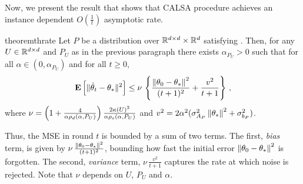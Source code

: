 Now, we present the result that shows that CALSA procedure achieves an instance dependent $O(\frac{1}{t})$ asymptotic rate.
\fi
\begin{restatable}{theorem}{thrate}\label{th:rate}
Let $P$ be a distribution over $\mathbb{R}^{d \times d}\times\mathbb{R}^d $ satisfying .
Then, for any $U\in\mathbb{R}^{d \times d}$ and $P_U$ as in the previous paragraph there exists
$\alpha_{P_U}>0$ such that 
for all $\alpha\in (0,\alpha_{P_U})$ and for all $t\ge 0$,
\begin{align*}
\mathbf{E}\left[\| \hat{\theta}_t-\theta_*\|^2\right]
\leq
\nu\,
\left\{\frac{\left\| \theta_0-\theta_*\right\|^2}{(t+1)^2}+ \frac{v^2}{t+1} \right\}\,,
\end{align*}
where $\nu = \left(1+\tfrac4{\alpha\rho_d(\alpha,P_U)}\right)\tfrac{2\kappa(U)^2}{\alpha \rho_s(\alpha,P_U)}$ and
$v^2 = 
2\alpha^2(\sigma_{A_P}^2\left\| \theta_*\right\|^2+\sigma_{b_P}^2)$.
\end{restatable}
Thus, the MSE in round $t$ is bounded by a sum of two terms. The first, \emph{bias} term, is given by $\nu \,\frac{\left\| \theta_0-\theta_*\right\|^2}{(t+1)^2}$, bounding how fast the initial error $\left\| \theta_0-\theta_*\right\|^2$ is forgotten. The second, \emph{variance} term, $\nu\, \frac{v^2}{t+1}$  captures the rate at which noise is rejected. Note that $\nu$ depends on $U$, $P_U$ and $\alpha$.

